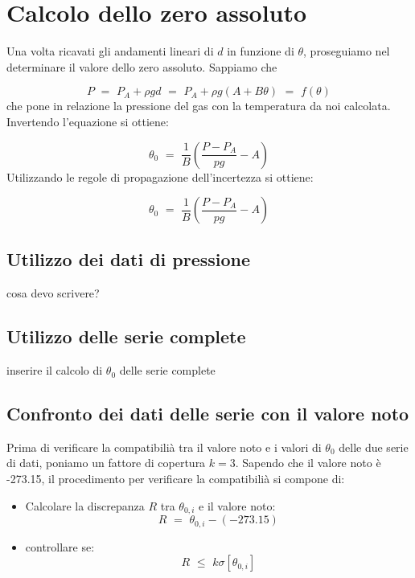 \section{Calcolo dello zero assoluto}

Una volta ricavati gli andamenti lineari di $d$ in funzione di $\theta$, proseguiamo nel determinare il valore dello zero assoluto. Sappiamo che 

\begin{equation}
	P \,\, = \,\, P_A + \rho g d \,\, = \,\, P_A + \rho g (A + B \theta) \,\, = \,\, f(\theta)
\end{equation}
%
che pone in relazione la pressione del gas con la temperatura da noi calcolata. Invertendo l'equazione si ottiene:

\begin{equation}
	\theta_0 \,\, = \,\, \frac{1}{B} \left( \frac{P - P_A}{pg} - A \right)
\end{equation}
%
Utilizzando le regole di propagazione dell'incertezza si ottiene:

\begin{equation}
	\theta_0 \,\, = \,\, \frac{1}{B} \left( \frac{P - P_A}{pg} - A \right)
\end{equation}

\subsection{Utilizzo dei dati di pressione}
cosa devo scrivere?

\subsection{Utilizzo delle serie complete}

inserire il calcolo di $\theta_0$ delle serie complete

\subsection{Confronto dei dati delle serie con il valore noto}
\label{confronto}
Prima di verificare la compatibilià tra il valore noto e i valori di $\theta_0$ delle due serie di dati, poniamo un fattore di copertura $k=3$. Sapendo che il valore noto è -273.15, il procedimento per verificare la compatibilià si compone di:

\begin{itemize}
\item Calcolare la discrepanza $R$ tra $\theta_{0,i}$ e il valore noto:
\begin{equation*}
	R \,\, = \,\, \theta_{0,i} - (-273.15)
\end{equation*}
\item controllare se:
\begin{equation*}
	R \,\, \leq \,\, k \sigma[\theta_{0,i}]
\end{equation*}
\end{itemize}

